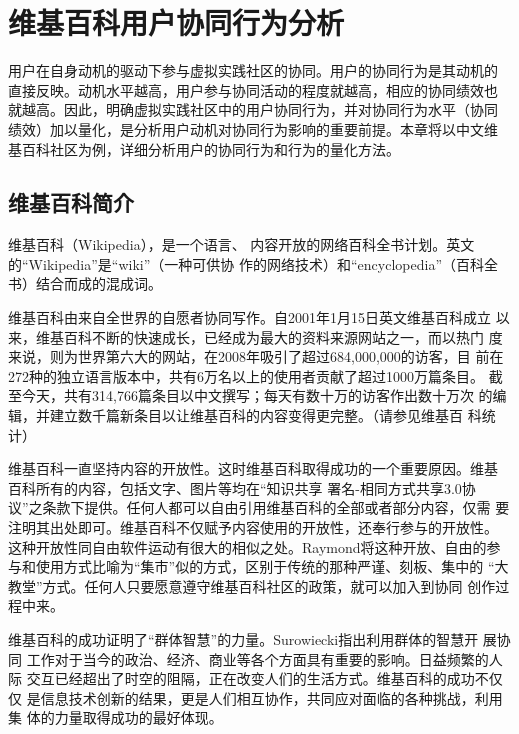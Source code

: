 
\chapter{维基百科用户协同行为分析}
\label{cha:wikipedian}

用户在自身动机的驱动下参与虚拟实践社区的协同。用户的协同行为是其动机的
直接反映。动机水平越高，用户参与协同活动的程度就越高，相应的协同绩效也
就越高。因此，明确虚拟实践社区中的用户协同行为，并对协同行为水平（协同
绩效）加以量化，是分析用户动机对协同行为影响的重要前提。本章将以中文维
基百科社区为例，详细分析用户的协同行为和行为的量化方法。
\section{维基百科简介}
维基百科（Wikipedia），是一个语言、
内容开放的网络百科全书计划。英文的“Wikipedia”是“wiki”（一种可供协
作的网络技术）和“encyclopedia”（百科全书）结合而成的混成词。

维基百科由来自全世界的自愿者协同写作。自2001年1月15日英文维基百科成立
以来，维基百科不断的快速成长，已经成为最大的资料来源网站之一，而以热门
度来说，则为世界第六大的网站，在2008年吸引了超过684,000,000的访客，目
前在272种的独立语言版本中，共有6万名以上的使用者贡献了超过1000万篇条目。
截至今天，共有314,766篇条目以中文撰写；每天有数十万的访客作出数十万次
的编辑，并建立数千篇新条目以让维基百科的内容变得更完整。（请参见维基百
科统计）

维基百科一直坚持内容的开放性。这时维基百科取得成功的一个重要原因。维基
百科所有的内容，包括文字、图片等均在“知识共享 署名-相同方式共享3.0协
议”之条款下提供。任何人都可以自由引用维基百科的全部或者部分内容，仅需
要注明其出处即可。维基百科不仅赋予内容使用的开放性，还奉行参与的开放性。
这种开放性同自由软件运动有很大的相似之处。Raymond将这种开放、自由的参
与和使用方式比喻为“集市”似的方式，区别于传统的那种严谨、刻板、集中的
“大教堂”方式。任何人只要愿意遵守维基百科社区的政策，就可以加入到协同
创作过程中来\cite{raymond1999cab}。

维基百科的成功证明了“群体智慧”的力量。Surowiecki指出利用群体的智慧开
展协同
工作对于当今的政治、经济、商业等各个方面具有重要的影响。日益频繁的人际
交互已经超出了时空的阻隔，正在改变人们的生活方式。维基百科的成功不仅仅
是信息技术创新的结果，更是人们相互协作，共同应对面临的各种挑战，利用集
体的力量取得成功的最好体现\cite{surowiecki:190}。



